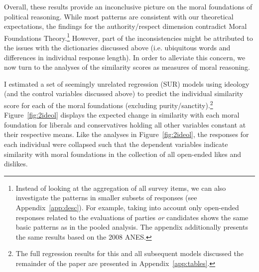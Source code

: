\documentclass[12pt]{article}
\begin{document}
Overall, these results provide an inconclusive picture on the moral foundations of political reasoning. While most patterns are consistent with our theoretical expectations, the findings for the authority/respect dimension contradict Moral Foundations Theory.\footnote{Instead of looking at the aggregation of all survey items, we can also investigate the patterns in smaller subsets of responses (see Appendix~\ref{app:desc}). For example, taking into account only open-ended responses related to the evaluations of parties \textit{or} candidates shows the same basic patterns as in the pooled analysis. The appendix additionally presents the same results based on the 2008 ANES.} However, part of the inconsistencies might be attributed to the issues with the dictionaries discussed above (i.e. ubiquitous words and differences in individual response length). In order to alleviate this concern, we now turn to the analyses of the similarity scores as measures of moral reasoning.

I estimated a set of seemingly unrelated regression (SUR) models using ideology (and the control variables discussed above) to predict the individual similarity score for each of the moral foundations (excluding purity/sanctity).\footnote{The full regression results for this and all subsequent models discussed the remainder of the paper are presented in Appendix~\ref{app:tables}.} Figure~\ref{fig:2ideol} displays the expected change in similarity with each moral foundation for liberals and conservatives holding all other variables constant at their respective means. Like the analyses in Figure~\ref{fig:2ideol}, the responses for each individual were collapsed such that the dependent variables indicate similarity with moral foundations in the collection of all open-ended likes and dislikes.
\end{document}

